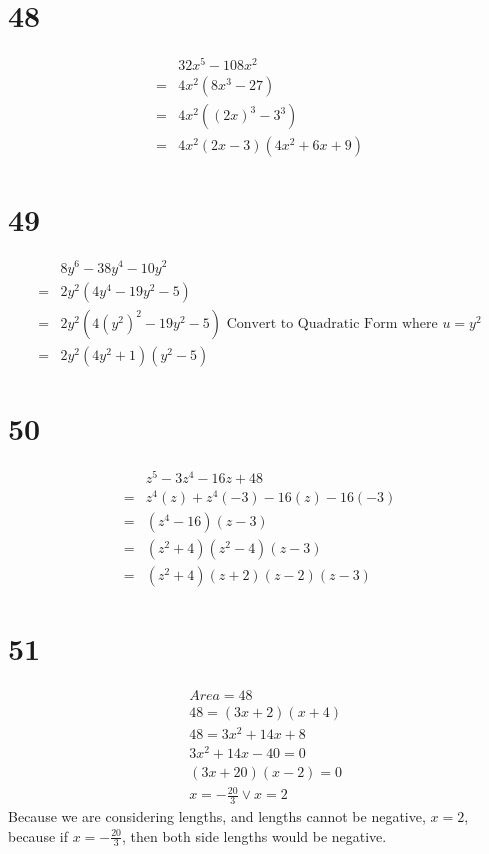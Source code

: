 \documentclass{article}
\theoremstyle{definition}
\begin{document}
\section*{48}
\[
\begin{array}{rl}
	& 32x^5-108x^2 \\
=	& 4x^2(8x^3-27) \\
=	& 4x^2((2x)^3-3^3) \\
=	& 4x^2(2x-3)(4x^2+6x+9)
\end{array}
\]

\section*{49}
\[
\begin{array}{rl}
	& 8y^6-38y^4-10y^2 \\
=	& 2y^2(4y^4-19y^2-5) \\
=	& 2y^2(4(y^2)^2-19y^2-5)\textrm{ Convert to Quadratic Form where $u=y^2$} \\
=	& 2y^2(4y^2+1)(y^2-5)
\end{array}
\]

\section*{50}
\[
\begin{array}{rl}
	& z^5-3z^4-16z+48 \\
=	& z^4(z)+z^4(-3)-16(z)-16(-3) \\
=	& (z^4-16)(z-3) \\
=	& (z^2+4)(z^2-4)(z-3) \\
=	& (z^2+4)(z+2)(z-2)(z-3)
\end{array}
\]

\section*{51}
\[
\begin{array}{rl}
	& Area=48 \\
	& 48=(3x+2)(x+4) \\
	& 48=3x^2+14x+8 \\
	& 3x^2+14x-40=0 \\
	& (3x+20)(x-2)=0 \\
	& x=-\frac{20}{3}\vee x=2
\end{array}
\]
Because we are considering lengths, and lengths cannot be negative, $x=2$, because if $x=-\frac{20}{3}$, then both side lengths would be negative.
\end{document}
